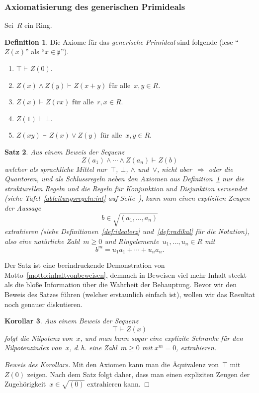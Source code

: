 \documentclass[a4paper,ngerman,12pt]{scrartcl}
\theoremstyle{definition}
\newtheorem{defn}{Definition}[section]
\theoremstyle{plain}
\newtheorem{kor}[defn]{Korollar}
\newtheorem{satz}[defn]{Satz}
\theoremstyle{remark}
\newcommand{\pp}{\mathfrak{p}}
\newcommand{\seq}[1]{\mathrel{\vdash\!\!\!_{#1}}}
\renewcommand{\_}{\mathpunct{.}\,}
\newcommand{\?}{\,{:}\,}
\begin{document}
\subsubsection*{Axiomatisierung des generischen Primideals}

Sei~$R$ ein Ring.

\begin{defn}\label{defn:genprime}Die Axiome für das \emph{generische Primideal}
sind folgende (lese "`$Z(x)$"' als "`$x \in \pp$"').
\begin{enumerate}
\item[1.] $\top \seq{} Z(0).$
\item[2.] $Z(x) \wedge Z(y) \seq{} Z(x+y)$ für alle~$x,y \in R$.
\item[3.] $Z(x) \seq{} Z(rx)$ für alle~$r,x \in R$.
\item[4.] $Z(1) \seq{} \bot.$
\item[5.] $Z(xy) \seq{} Z(x) \vee Z(y)$ für alle~$x,y \in R$.
\end{enumerate}
\end{defn}

\begin{satz}\label{satz:genprime}Aus einem Beweis der Sequenz
\[ Z(a_1) \wedge \cdots \wedge Z(a_n) \seq{} Z(b) \]
welcher als sprachliche Mittel nur~$\top$, $\bot$, $\wedge$ und~$\vee$, nicht
aber~$\Rightarrow$ oder die Quantoren, und als Schlussregeln neben den Axiomen
aus Definition~\ref{defn:genprime} nur die
strukturellen Regeln und die Regeln für Konjunktion und Disjunktion verwendet (siehe
Tafel~\ref{ableitungsregeln:int} auf Seite~\pageref{ableitungsregeln:int}), kann man einen expliziten Zeugen der Aussage
\[ b \in \sqrt{(a_1,\ldots,a_n)} \]
extrahieren (siehe Definitionen~\ref{def:idealerz} und~\ref{def:radikal} für
die Notation), also eine natürliche Zahl~$m \geq 0$ und
Ringelemente~$u_1,\ldots,u_n \in R$ mit
\[ b^m = u_1 a_1 + \cdots + u_n a_n. \]
\end{satz}

Der Satz ist eine beeindruckende
Demonstration von Motto~\ref{motto:inhaltvonbeweisen}, demnach in
Beweisen viel mehr Inhalt steckt als die bloße Information
über die Wahrheit der Behauptung. Bevor wir den Beweis des Satzes führen (welcher
erstaunlich einfach ist), wollen wir das Resultat noch genauer
diskutieren.

\begin{kor}Aus einem Beweis der Sequenz
\[ \top \seq{} Z(x) \]
folgt die Nilpotenz von~$x$, und man kann sogar eine explizite Schranke
für den Nilpotenzindex von~$x$, d.\,h. eine Zahl~$m \geq 0$ mit $x^m = 0$,
extrahieren.
\end{kor}
\begin{proof}[Beweis des Korollars] Mit den Axiomen kann man die Äquivalenz
von~$\top$ mit~$Z(0)$ zeigen. Nach dem Satz folgt daher, dass man einen
expliziten Zeugen der Zugehörigkeit~$x \in \sqrt{(0)}$ extrahieren
kann.\end{proof}
\end{document}

